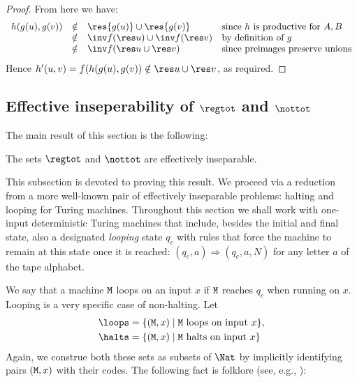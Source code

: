 \documentclass[runningheads]{amsart}
\newcommand{\TM}{\text{\rm\tt M}}
\begin{document}
\begin{proof}
From here we have:
\[
\begin{array}{rcll}
     h(g(u),g(v)) & \notin & \res{g(u)} \cup \res{g(v)} & \text{since $h$ is productive for $A,B$} \\
        & \notin & \inv f (\res u) \cup \inv f (\res v) & \text{by definition of $g$} \\
        & \notin & \inv f (\res u \cup \res v) & \text{since preimages preserve unions}
\end{array}
\]
% 
Hence $h'(u,v) = f(h(g(u), g(v)) \notin  \res u \cup \res v$, as required.
\end{proof}



\subsection{Effective inseperability of $\regtot$ and $\nottot $}

The main result of this section is the following:

\begin{theorem}
\label{regtot-nottot-eff-insep}
The sets $\regtot$ and $\nottot$ are effectively inseparable.
\end{theorem}
This subsection is devoted to proving this result.
We proceed via a reduction from a more well-known pair of effectively inseparable problems: halting and looping for Turing machines. 
% 
Throughout this section we shall work with one-input deterministic Turing machines that include, besides the initial and final state, also a designated {\em looping} state $q_c$ with rules that force the machine to remain at this state once it is reached: $(q_c, a) \Rightarrow (q_c, a, N)$ for any letter $a$ of the tape alphabet.

We say that a machine $\TM$ loops on an input $x$ if $\TM$ reaches $q_c$ when running on $x$. Looping is a very specific case of non-halting. Let 
\begin{align*}
& \loops = \{ (\TM,x) \mid \mbox{$\TM$ loops on input $x$} \}, \\
& \halts = \{ (\TM,x) \mid \mbox{$\TM$ halts on input $x$} \}
\end{align*}
Again, we construe both these sets as subsets of $\Nat$ by implicitly identifying pairs $(\TM,x)$ with their codes.
The following fact is folklore (see, e.g., \cite[Exercise 7-55d]{Rogers1987}\cite[Proposition 3]{Kuznetsov2021TOCL}):
\end{document}
